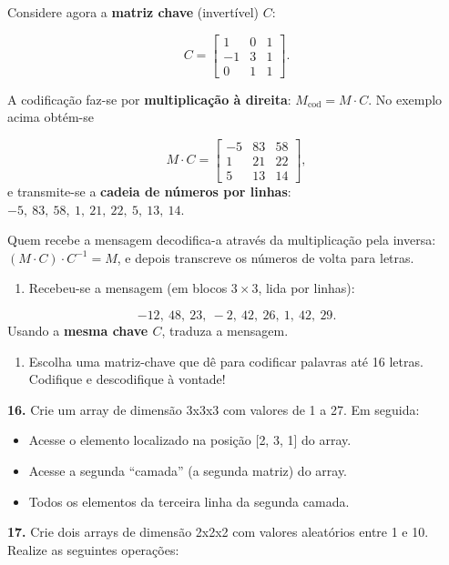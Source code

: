\documentclass[
]{book}
\providecommand{\tightlist}{%
  \setlength{\itemsep}{0pt}\setlength{\parskip}{0pt}}
\begin{document}
Considere agora a \textbf{matriz chave} (invertível) \(C\):

\[
C=\begin{bmatrix}
1&0&1\\
-1&3&1\\
0&1&1
\end{bmatrix}.
\]

A codificação faz-se por \textbf{multiplicação à direita}: \(M_{\text{cod}} = M\cdot C\).
No exemplo acima obtém-se

\[
M\cdot C=\begin{bmatrix}
-5 & 83 & 58\\
1 & 21 & 22\\
5 & 13 & 14
\end{bmatrix},
\]
e transmite-se a \textbf{cadeia de números por linhas}:\\
\(-5,\ 83,\ 58,\ 1,\ 21,\ 22,\ 5,\ 13,\ 14\).

Quem recebe a mensagem decodifica-a através da multiplicação pela inversa:
\((M\cdot C)\cdot C^{-1}=M\), e depois transcreve os números de volta para letras.

\begin{enumerate}
\def\labelenumi{(\alph{enumi})}
\tightlist
\item
  Recebeu-se a mensagem (em blocos \(3\times3\), lida por linhas):
\end{enumerate}

\[-12,\ 48,\ 23,\ -2,\ 42,\ 26,\ 1,\ 42,\ 29.\]
Usando a \textbf{mesma chave \(C\)}, traduza a mensagem.

\begin{enumerate}
\def\labelenumi{(\alph{enumi})}
\setcounter{enumi}{1}
\tightlist
\item
  Escolha uma matriz-chave que dê para codificar palavras até 16 letras. Codifique e descodifique à vontade!
\end{enumerate}

\textbf{16.} Crie um array de dimensão 3x3x3 com valores de 1 a 27. Em
seguida:

\begin{itemize}
\tightlist
\item
  Acesse o elemento localizado na posição {[}2, 3, 1{]} do array.
\item
  Acesse a segunda ``camada'' (a segunda matriz) do array.
\item
  Todos os elementos da terceira linha da segunda camada.
\end{itemize}

\textbf{17.} Crie dois arrays de dimensão 2x2x2 com valores aleatórios entre
1 e 10. Realize as seguintes operações:
\end{document}
